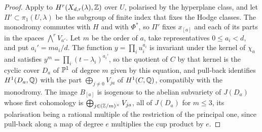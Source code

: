 \begin{proof}
Apply  to $H^{r}(X_{d,r}(\lambda),\mathbb{Z})$ over $U$,
polarised by the hyperplane class, and let $\Pi'\subset\pi_{1}(U,\lambda)$ be
the subgroup of finite index that fixes the Hodge classes. The monodromy
commutes with $H$ and with $\Phi^{*}$, so $\Pi'$ fixes $x_{[a]}$ and each of
its parts in the spaces $\bigwedge^{r}V_{a'}$. Let $m$ be the order of $a$,
take representatives $0\le a_{i}<d$, and put $a_{i}'=ma_{i}/d$. The function
$y=\prod_{i}u_{i}^{a_{i}}$ is invariant under the kernel of $\chi_{a}$ and
satisfies $y^{m}=\prod_{i}(t-\lambda_{i})^{a_{i}'}$, so the quotient of $C$ by
that kernel is the cyclic cover $D_{a}$ of $\mathbb{P}^{1}$ of degree $m$ given by
this equation, and pull-back identifies $H^{1}(D_{a},\mathbb{Q})$ with the part
$\bigoplus_{j\ne0}V_{ja}$ of $H^{1}(C,\mathbb{Q})$, compatibly with the monodromy.
The image $B_{[a]}$ is isogenous to the abelian subvariety of $J(D_{a})$
whose first cohomology is $\bigoplus_{j\in(\mathbb{Z}/m)^{\times}}V_{ja}$, all of
$J(D_{a})$ for $m\le3$, its polarisation being a rational multiple of the
restriction of the principal one, since pull-back along a map of degree $e$
multiplies the cup product by $e$.


\end{proof}

